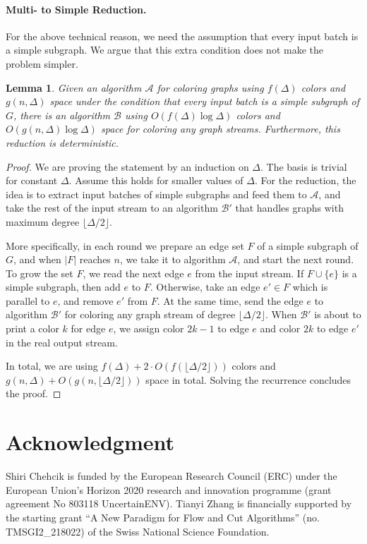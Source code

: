 \documentclass[11pt,a4paper]{article}
\newtheorem{lemma}{Lemma}[section]
\newcommand{\floor}[1]{\lfloor #1 \rfloor}
\begin{document}
\paragraph*{Multi- to Simple Reduction.} For the above technical reason, we need the assumption that every input batch is a simple subgraph. We argue that this extra condition does not make the problem simpler.
\begin{lemma}
	Given an algorithm $\mathcal{A}$ for coloring graphs using $f(\Delta)$ colors and $g(n, \Delta)$ space under the condition that every input batch is a simple subgraph of $G$, there is an algorithm $\mathcal{B}$ using $O(f(\Delta)\log\Delta)$ colors and $O(g(n, \Delta)\log\Delta)$ space for coloring any graph streams. Furthermore, this reduction is deterministic.
\end{lemma}
\begin{proof}
	We are proving the statement by an induction on $\Delta$. The basis is trivial for constant $\Delta$. Assume this holds for smaller values of $\Delta$. For the reduction, the idea is to extract input batches of simple subgraphs and feed them to $\mathcal{A}$, and take the rest of the input stream to an algorithm $\mathcal{B}'$ that handles graphs with maximum degree $\floor{\Delta/2}$.
	
	More specifically, in each round we prepare an edge set $F$ of a simple subgraph of $G$, and when $|F|$ reaches $n$, we take it to algorithm $\mathcal{A}$, and start the next round. To grow the set $F$, we read the next edge $e$ from the input stream. If $F\cup \{e\}$ is a simple subgraph, then add $e$ to $F$. Otherwise, take an edge $e'\in F$ which is parallel to $e$, and remove $e'$ from $F$. At the same time, send the edge $e$ to algorithm $\mathcal{B}'$ for coloring any graph stream of degree $\floor{\Delta/2}$. When $\mathcal{B}'$ is about to print a color $k$ for edge $e$, we assign color $2k-1$ to edge $e$ and color $2k$ to edge $e'$ in the real output stream.
	
	In total, we are using $f(\Delta) + 2\cdot O(f(\floor{\Delta/2}))$ colors and $g(n, \Delta) + O(g(n, \floor{\Delta/2}))$ space in total. Solving the recurrence concludes the proof.
\end{proof} 
\section*{Acknowledgment}
Shiri Chehcik is funded by the European Research Council (ERC) under the European Union’s Horizon 2020 research and innovation programme (grant agreement No 803118 UncertainENV). Tianyi Zhang is financially supported by the starting grant ``A New Paradigm for Flow and Cut Algorithms'' (no. TMSGI2\_218022) of the Swiss National Science Foundation.


\vspace{5mm}


\end{document}

